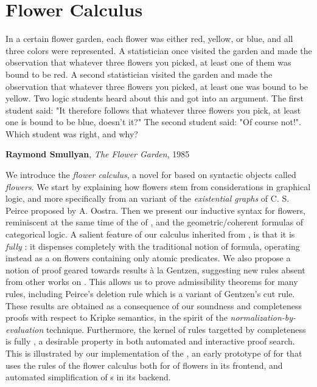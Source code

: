 \setchapterpreamble[u]{\margintoc}
\chapter{Flower Calculus}

\epigraph{In a certain flower garden, each flower was either red, yellow, or
blue, and all three colors were represented. A statistician once visited the
garden and made the observation that whatever three flowers you picked, at least
one of them was bound to be red. A second statistician visited the garden and
made the observation that whatever three flowers you picked, at least one was
bound to be yellow. Two logic students heard about this and got into an
argument. The first student said: "It therefore follows that whatever three
flowers you pick, at least one is bound to be blue, doesn't it?" The second
student said: "Of course not!". Which student was right, and why?
}{\textbf{Raymond Smullyan}, \textit{The Flower Garden}, 1985}

We introduce the \emph{flower calculus}, a novel  for
  based on syntactic objects called
\emph{flowers}. We start by explaining how flowers stem from considerations in
graphical logic, and more specifically from an  variant of
the \emph{existential graphs} of C. S. Peirce proposed by A. Oostra. Then we
present our inductive syntax for flowers, reminiscent at the same time of the
 of  , and the geometric/coherent
formulas of categorical logic. A salient feature of our calculus inherited from
, is that it is \emph{fully }: it dispenses completely with
the traditional notion of  formula, operating instead as a
 on flowers containing only atomic predicates. We also propose a
notion of proof geared towards  results à la Gentzen, suggesting new
rules absent from other works on  . This allows us to
prove admissibility theorems for many rules, including Peirce's deletion rule
which is a variant of Gentzen's cut rule. These results are obtained as a
consequence of our soundness and completeness proofs with respect to Kripke
semantics, in the spirit of the \emph{normalization-by-evaluation} technique.
Furthermore, the kernel of rules targetted by completeness is fully ,
a desirable property in both automated and interactive proof search. This is
illustrated by our implementation of the , an early prototype of
 for  that uses the rules of the flower calculus both for  of flowers in its frontend, and automated simplification of s
in its backend.

